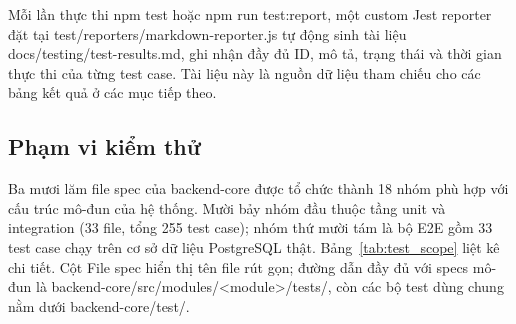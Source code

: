 Mỗi lần thực thi npm test hoặc npm run test:report, một custom Jest reporter đặt tại test/reporters/markdown-reporter.js tự động sinh tài liệu docs/testing/test-results.md, ghi nhận đầy đủ ID, mô tả, trạng thái và thời gian thực thi của từng test case. Tài liệu này là nguồn dữ liệu tham chiếu cho các bảng kết quả ở các mục tiếp theo.

\subsection{Phạm vi kiểm thử}

Ba mươi lăm file spec của backend-core được tổ chức thành 18 nhóm phù hợp với cấu trúc mô-đun của hệ thống. Mười bảy nhóm đầu thuộc tầng unit và integration (33 file, tổng 255 test case); nhóm thứ mười tám là bộ E2E gồm 33 test case chạy trên cơ sở dữ liệu PostgreSQL thật. Bảng~\ref{tab:test_scope} liệt kê chi tiết. Cột File spec hiển thị tên file rút gọn; đường dẫn đầy đủ với specs mô-đun là backend-core/src/modules/<module>/tests/, còn các bộ test dùng chung nằm dưới backend-core/test/.

